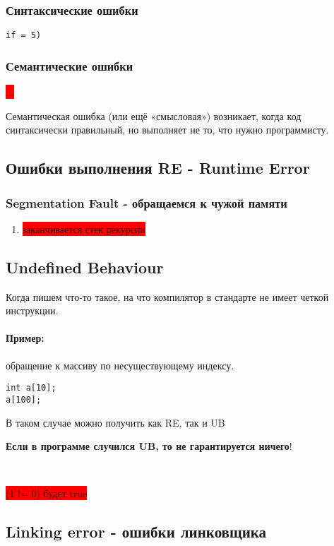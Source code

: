 \documentclass[12pt]{article}
\begin{document}
\subsubsection{Синтаксические ошибки}
\texttt{if = 5)}

\subsubsection{Семантические ошибки}
\colorbox{red}{...}

Семантическая ошибка (или ещё «смысловая») возникает, когда код синтаксически правильный, но выполняет не то, что нужно программисту.

\subsection[Runtime Error]{Ошибки выполнения RE - Runtime Error}

\subsubsection[Segmentation Fault]{Segmentation Fault - обращаемся к чужой памяти} 
\begin{enumerate}
	\item \colorbox{red}{заканчивается стек рекурсии}
\end{enumerate}

\subsection{Undefined Behaviour} 

Когда пишем что-то такое, на что компилятор в стандарте не имеет четкой инструкции.

\paragraph{Пример:} обращение к массиву по несуществующему индексу. 
\begin{lstlisting}
int a[10];
a[100]; 
\end{lstlisting}

В таком случае можно получить как RE, так и UB 

\textbf{Если в программе случился UB, то не гарантируется ничего}! 

\

\colorbox{red}{(1 != 0) будет true}

\subsection[Linking Error]{Linking error - ошибки линковщика}
\end{document}
